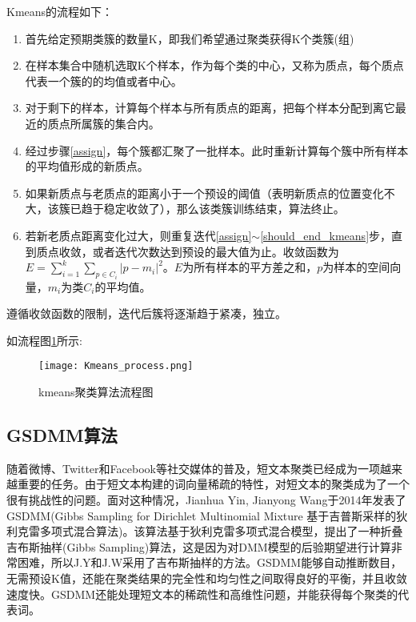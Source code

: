 Kmeans的流程如下：
\begin{enumerate}
	\item 首先给定预期类簇的数量K，即我们希望通过聚类获得K个类簇(组)
	\item 在样本集合中随机选取K个样本，作为每个类的中心，又称为质点，每个质点代表一个簇的的均值或者中心。
	\item\label{assign} 对于剩下的样本，计算每个样本与所有质点的距离，把每个样本分配到离它最近的质点所属簇的集合内。
	\item 经过步骤\ref{assign}，每个簇都汇聚了一批样本。此时重新计算每个簇中所有样本的平均值形成的新质点。
	\item\label{should_end_kmeans} 如果新质点与老质点的距离小于一个预设的阈值（表明新质点的位置变化不大，该簇已趋于稳定收敛了），那么该类簇训练结束，算法终止。
	\item 若新老质点距离变化过大，则重复迭代\ref{assign}$\sim$\ref{should_end_kmeans}步，直到质点收敛，或者迭代次数达到预设的最大值为止。收敛函数为$E=\sum_{i=1}^{k} \sum_{p\in C_i} \left| p - m_i \right|^2$。$E$为所有样本的平方差之和，$p$为样本的空间向量，$m_i$为类$C_i$的平均值。
\end{enumerate}

遵循收敛函数的限制，迭代后簇将逐渐趋于紧凑，独立。

如流程图\ref{kmeans_process}所示:
\begin{figure}[H]
	\begin{center}
		\texttt{[image: Kmeans\_process.png]}
	\end{center}
	\caption{kmeans聚类算法流程图}
	\label{kmeans_process}
\end{figure}


\subsection{GSDMM算法}
随着微博、Twitter和Facebook等社交媒体的普及，短文本聚类已经成为一项越来越重要的任务。由于短文本构建的词向量稀疏的特性，对短文本的聚类成为了一个很有挑战性的问题。面对这种情况，Jianhua Yin, Jianyong Wang于2014年发表了GSDMM(Gibbs Sampling for Dirichlet Multinomial Mixture 基于吉普斯采样的狄利克雷多项式混合算法)\cite{Yin:2014}。该算法基于狄利克雷多项式混合模型，提出了一种折叠吉布斯抽样(Gibbs Sampling)算法，这是因为对DMM模型的后验期望进行计算非常困难，所以J.Y和J.W采用了吉布斯抽样的方法。GSDMM能够自动推断数目，无需预设K值，还能在聚类结果的完全性和均匀性之间取得良好的平衡，并且收敛速度快。GSDMM还能处理短文本的稀疏性和高维性问题，并能获得每个聚类的代表词。

